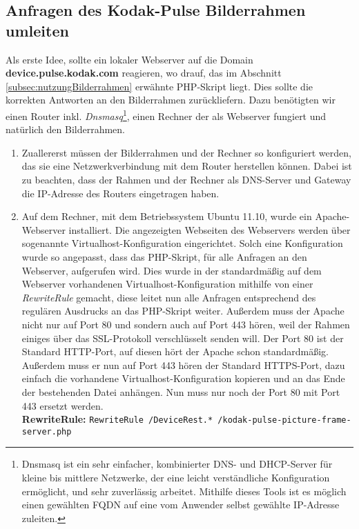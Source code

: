 \begin{flushleft}
  \subsection{Anfragen des Kodak-Pulse Bilderrahmen umleiten}
    Als erste Idee, sollte ein lokaler Webserver auf die Domain \textbf{device.pulse.kodak.com} reagieren, wo drauf, das im Abschnitt \ref{subsec:nutzungBilderrahmen}  erwähnte PHP-Skript liegt. Dies sollte die korrekten Antworten an den Bilderrahmen zurückliefern.
    Dazu benötigten wir einen Router inkl. \textit{Dnsmasq}\footnote{Dnsmasq ist ein sehr einfacher, kombinierter DNS- und DHCP-Server für kleine bis mittlere Netzwerke, der eine leicht verständliche Konfiguration ermöglicht, und sehr zuverlässig arbeitet. Mithilfe dieses Tools ist es möglich einen gewählten FQDN auf eine vom Anwender selbst gewählte IP-Adresse zuleiten.}, einen Rechner der als Webserver fungiert und natürlich den Bilderrahmen.
    \begin{enumerate}
      \item Zuallererst müssen der Bilderrahmen und der Rechner so konfiguriert werden, das sie eine Netzwerkverbindung mit dem Router herstellen können. Dabei ist zu beachten, dass der Rahmen und der Rechner als DNS-Server und Gateway die IP-Adresse des Routers eingetragen haben.
      \item Auf dem Rechner, mit dem Betriebssystem Ubuntu 11.10, wurde ein Apache-Webserver installiert. Die angezeigten Webseiten des Webservers werden über sogenannte Virtualhost-Konfiguration eingerichtet. Solch eine Konfiguration wurde so angepasst, dass das PHP-Skript, für alle Anfragen an den Webserver, aufgerufen wird. Dies wurde in der standardmäßig auf dem Webserver vorhandenen Virtualhost-Konfiguration mithilfe von einer \textit{RewriteRule} gemacht, diese leitet nun alle Anfragen entsprechend des regulären Ausdrucks an das PHP-Skript weiter. Außerdem muss der Apache nicht nur auf Port 80 und sondern auch auf Port 443 hören, weil der Rahmen einiges über das SSL-Protokoll verschlüsselt senden will. Der Port 80 ist der Standard HTTP-Port, auf diesen hört der Apache schon standardmäßig. Außerdem muss er nun auf Port 443 hören der Standard HTTPS-Port, dazu einfach die vorhandene Virtualhost-Konfiguration kopieren und an das Ende der bestehenden Datei anhängen. Nun muss nur noch der Port 80 mit Port 443 ersetzt werden.\\\vspace{.3cm}
      \textbf{RewriteRule:}
      \verb|RewriteRule /DeviceRest.* /kodak-pulse-picture-frame-server.php|\\

\end{enumerate}
\end{flushleft}
